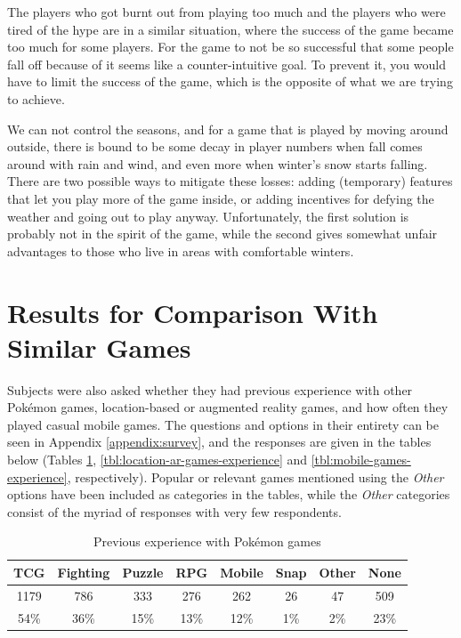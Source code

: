 The players who got burnt out from playing too much and the players who were tired of the hype are in a similar situation, where the success of the game became too much for some players. For the game to not be so successful that some people fall off because of it seems like a counter-intuitive goal. To prevent it, you would have to limit the success of the game, which is the opposite of what we are trying to achieve.

We can not control the seasons, and for a game that is played by moving around outside, there is bound to be some decay in player numbers when fall comes around with rain and wind, and even more when winter's snow starts falling. There are two possible ways to mitigate these losses: adding (temporary) features that let you play more of the game inside, or adding incentives for defying the weather and going out to play anyway. Unfortunately, the first solution is probably not in the spirit of the game, while the second gives somewhat unfair advantages to those who live in areas with comfortable winters.

\section{Results for Comparison With Similar Games}
Subjects were also asked whether they had previous experience with other Pokémon games, location-based or augmented reality games, and how often they played casual mobile games. The questions and options in their entirety can be seen in Appendix \ref{appendix:survey}, and the responses are given in the tables below (Tables \ref{tbl:pokemon-games-experience}, \ref{tbl:location-ar-games-experience} and \ref{tbl:mobile-games-experience}, respectively). Popular or relevant games mentioned using the \emph{Other} options have been included as categories in the tables, while the \emph{Other} categories consist of the myriad of responses with very few respondents.

\begin{table}[h]
	\centering
	\caption{Previous experience with Pokémon games}
	\label{tbl:pokemon-games-experience}
	\begin{tabular}{|c|c|c|c|c|c|c|c|}
		\hline
		\textbf{TCG} & \textbf{Fighting} & \textbf{Puzzle} & \textbf{RPG} & \textbf{Mobile} & \textbf{Snap} & \textbf{Other} & \textbf{None}\\
		\hline\hline
		1179	& 786	& 333	& 276	& 262	& 26	& 47	& 509\\
		54\%	& 36\%	& 15\%	& 13\%	& 12\%	& 1\%	& 2\%	& 23\%\\\hline
	\end{tabular}
\end{table}

